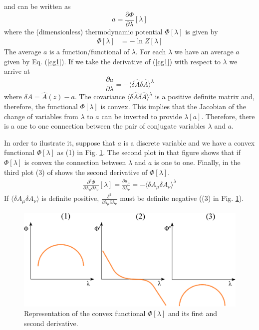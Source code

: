 \documentclass[a4paper,openright,12pt]{book}
\begin{document}
and can be written as 
\begin{equation}
a =\frac{\partial \Phi}{\partial
\lambda}[\lambda] 
\label{cg1}
\end{equation}
where the  (dimensionless) thermodynamic potential  $\Phi[\lambda]$ is
given by
\begin{align}
  \Phi[\lambda]&=-\ln Z[\lambda]
    \label{PhiLambda}
\end{align}
The average $a$  is a function/functional of  $\lambda$. For each
$\lambda$ we  have an average  $a$ given  by Eq. (\ref{cg1}).   If we
take the derivative of (\ref{cg1}) with respect to $\lambda$ we arrive
at
\begin{equation}
\frac{\partial a }{\partial \lambda}= -\langle \delta \hat{A}\delta
\hat{A}\rangle^\lambda
\label{covariances}
\end{equation}
where $\delta  A =  \hat{A}(z)-a$.  The  covariance $\langle  \delta \hat{A}\delta
\hat{A}\rangle^{\lambda}$ is a positive definite matrix and, therefore, the functional
$\Phi[\lambda]$  is convex.  This  implies that  the  Jacobian of  the
change of variables  from $\lambda$ to $a$ can be  inverted to provide
$\lambda[a]$.   Therefore, there  is  a  one to  one  connection
between the  pair of conjugate  variables $\lambda$ and  $a$.

In order to ilustrate it, suppose that $a$ is a discrete variable and we have a convex functional $\Phi[\lambda]$ as (1) in Fig. \ref{fig:PhiConvex}. 
The second plot in that figure shows that if $\Phi[\lambda]$ is convex the connection between $\lambda$ and $a$ is one to one.
Finally, in the third plot (3) of shows the second derivative of $\Phi[\lambda]$.  
\begin{align}
    \frac{\partial^2 \Phi}{\partial\lambda_{\mu}\partial\lambda_{\nu}}[\lambda]
    =\frac{\partial a_{\mu}}{\partial\lambda_{\nu}}
    =-\langle\delta A_{\mu}\delta A_{\nu}\rangle^{\lambda}
\end{align}
If $\langle\delta A_{\mu}\delta A_{\nu}\rangle$ is definite positive, $\frac{\delta^2}{\partial\lambda_{\mu}\partial\lambda_{\nu}}$ must be definite negative ((3) in Fig. \ref{fig:PhiConvex}). 
\begin{figure}
    \centering
    \includegraphics[scale=0.6]{PhiConvex}
    \caption[Connection one to one between $\lambda$ and $a$]{Representation of the convex functional $\Phi[\lambda]$ and its first and second derivative.}
    \label{fig:PhiConvex}
\end{figure}
\end{document}
